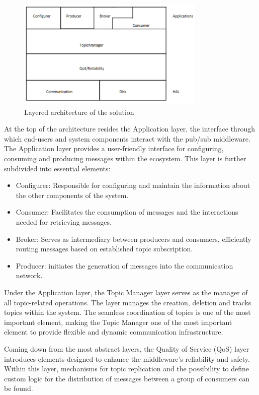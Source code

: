 \begin{figure}[H]
    \centering
    \includegraphics[width=0.8\textwidth]{Figures/architecture_layers.png}
    \caption{Layered architecture of the solution}
\end{figure}

At the top of the architecture resides the Application layer, the interface
through which end-users and system components interact with the pub/sub
middleware. The Application layer provides a user-friendly interface for
configuring, consuming and producing messages within the ecosystem.
This layer is further subdivided into essential elements:

\begin{itemize}
    \item   Configurer: Responsible for configuring and maintain the
            information about the other components of the system.
    \item   Consumer: Facilitates the consumption of messages and the
            interactions needed for retrieving messages.
    \item   Broker: Serves as intermediary between producers and consumers,
            efficiently routing messages based on established topic
            subscription.
    \item   Producer: initiates the generation of messages into the
            communication network.
\end{itemize}

Under the Application layer, the Topic Manager layer serves as the manager of
all topic-related operations. The layer manages the creation, deletion and
tracks topics within the system. The seamless coordination of topics is one
of the most important element, making the Topic Manager one of the most
important element to provide flexible and dynamic communication infrastructure.

Coming down from the most abstract layers, the Quality of Service (QoS) layer
introduces elements designed to enhance the middleware's reliability and
safety. Within this layer, mechanisms for topic replication and the possibility
to define custom logic for the distribution of messages between a group of
consumers can be found.


